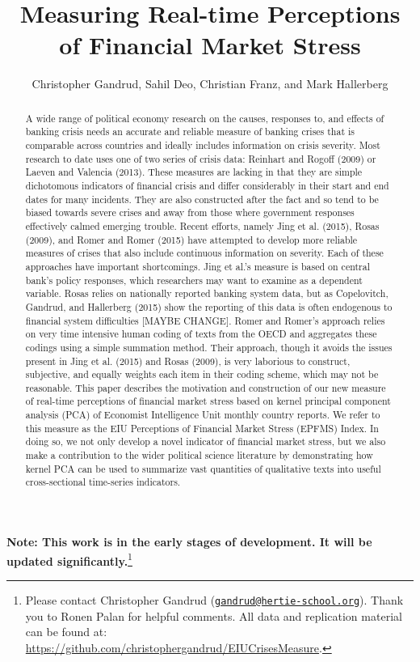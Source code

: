\documentclass[]{article}
\title{Measuring Real-time Perceptions of Financial Market Stress}
\author{Christopher Gandrud, Sahil Deo, Christian Franz, and Mark Hallerberg}
\date{}
\let\rmarkdownfootnote\footnote%
\def\footnote{\protect\rmarkdownfootnote}
\begin{document}
\maketitle


\textbf{Note: This work is in the early stages of development. It will
be updated significantly.}\footnote{Please contact Christopher Gandrud
  (\href{mailto:gandrud@hertie-school.org}{\nolinkurl{gandrud@hertie-school.org}}).
  Thank you to Ronen Palan for helpful comments. All data and
  replication material can be found at:
  \url{https://github.com/christophergandrud/EIUCrisesMeasure}.}

\begin{abstract}
A wide range of political economy research on the causes, responses to, and effects of banking crisis needs an accurate and reliable measure of banking crises that is comparable across countries and ideally includes information on crisis severity. Most research to date uses one of two series of crisis data: Reinhart and Rogoff (2009) or Laeven and Valencia (2013). These measures are lacking in that they are simple dichotomous indicators of financial crisis and differ considerably in their start and end dates for many incidents. They are also constructed after the fact and so tend to be biased towards severe crises and away from those where government responses effectively calmed emerging trouble. Recent efforts, namely Jing et al. (2015), Rosas (2009), and Romer and Romer (2015) have attempted to develop more reliable measures of crises that also include continuous information on severity. Each of these approaches have important shortcomings. Jing et al.’s measure is based on central bank’s policy responses, which researchers may want to examine as a dependent variable. Rosas relies on nationally reported banking system data, but as Copelovitch, Gandrud, and Hallerberg (2015) show the reporting of this data is often endogenous to financial system difficulties [MAYBE CHANGE]. Romer and Romer’s approach relies on very time intensive human coding of texts from the OECD and aggregates these codings using a simple summation method. Their approach, though it avoids the issues present in Jing et al. (2015) and Rosas (2009), is very laborious to construct, subjective, and equally weights each item in their coding scheme, which may not be reasonable. This paper describes the motivation and construction of our new measure of real-time perceptions of financial market stress based on kernel principal component analysis (PCA) of Economist Intelligence Unit monthly country reports. We refer to this measure as the EIU Perceptions of Financial Market Stress (EPFMS) Index. In doing so, we not only develop a novel indicator of financial market stress, but we also make a contribution to the wider political science literature by demonstrating how kernel PCA can be used to summarize vast quantities of qualitative texts into useful cross-sectional time-series indicators.
\end{abstract}
\end{document}
